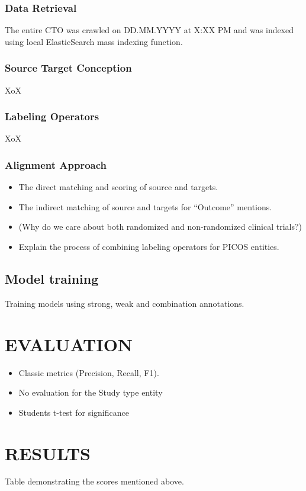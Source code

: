 \documentclass[10.7pt,]{article}
\begin{document}
\subsubsection{Data Retrieval}
%
The entire CTO was crawled on DD.MM.YYYY at X:XX PM and was indexed using local ElasticSearch mass indexing function. 
%
%
\subsubsection{Source Target Conception}
%
XoX
%
%
\subsubsection{Labeling Operators}
%
XoX
%
%
\subsubsection{Alignment Approach}
%
\begin{itemize}
    \item The direct matching and scoring of source and targets.
    \item The indirect matching of source and targets for ``Outcome'' mentions.
    \item (Why do we care about both randomized and non-randomized clinical trials?)
    \item Explain the process of combining labeling operators for PICOS entities.
\end{itemize}
%
%
%
\subsection{Model training}\label{modtrain}
Training models using strong, weak and combination annotations.
%
%
%
\section{EVALUATION}\label{eval}
%
\begin{itemize}
    \item Classic metrics (Precision, Recall, F1).
    \item No evaluation for the Study type entity
    \item Students t-test for significance
\end{itemize}
%
%
%
\section{RESULTS}\label{results}
%
Table demonstrating the scores mentioned above.
%
%
%
\end{document}

